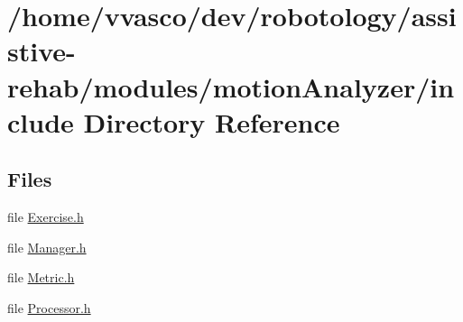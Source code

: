 \section{/home/vvasco/dev/robotology/assistive-\/rehab/modules/motion\+Analyzer/include Directory Reference}
\label{dir_8d3a6da778564209f43cd2f6930ea76e}
\subsection*{Files}
\begin{DoxyCompactItemize}
\item 
file \hyperlink{Exercise_8h}{Exercise.\+h}
\item 
file \hyperlink{Manager_8h}{Manager.\+h}
\item 
file \hyperlink{Metric_8h}{Metric.\+h}
\item 
file \hyperlink{Processor_8h}{Processor.\+h}
\end{DoxyCompactItemize}
